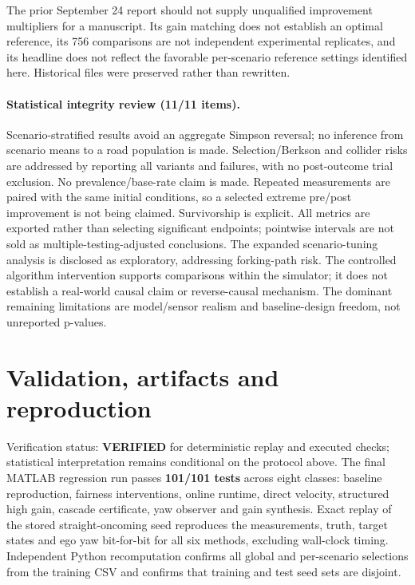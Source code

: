 \documentclass[11pt]{article}
\begin{document}
The prior September 24 report should not supply unqualified improvement
multipliers for a manuscript. Its gain matching does not establish an optimal
reference, its 756 comparisons are not independent experimental replicates,
and its headline does not reflect the favorable per-scenario reference settings
identified here. Historical files were preserved rather than rewritten.

\paragraph{Statistical integrity review (11/11 items).}
Scenario-stratified results avoid an aggregate Simpson reversal; no inference
from scenario means to a road population is made. Selection/Berkson and
collider risks are addressed by reporting all variants and failures, with no
post-outcome trial exclusion. No prevalence/base-rate claim is made. Repeated
measurements are paired with the same initial conditions, so a selected
extreme pre/post improvement is not being claimed. Survivorship is explicit.
All metrics are exported rather than selecting significant endpoints; pointwise
intervals are not sold as multiple-testing-adjusted conclusions. The expanded
scenario-tuning analysis is disclosed as exploratory, addressing forking-path
risk. The controlled algorithm intervention supports comparisons within the
simulator; it does not establish a real-world causal claim or reverse-causal
mechanism. The dominant remaining limitations are model/sensor realism and
baseline-design freedom, not unreported p-values.

\section{Validation, artifacts and reproduction}
Verification status: \textbf{VERIFIED} for deterministic replay and executed
checks; statistical interpretation remains conditional on the protocol above.
The final MATLAB regression run passes \textbf{101/101 tests} across eight
classes: baseline reproduction, fairness interventions, online runtime,
direct velocity, structured high gain, cascade certificate, yaw observer and
gain synthesis. Exact replay of the stored straight-oncoming seed reproduces
the measurements, truth, target states and ego yaw bit-for-bit for all six
methods, excluding wall-clock timing. Independent Python recomputation
confirms all global and per-scenario selections from the training CSV and
confirms that training and test seed sets are disjoint.
\end{document}
